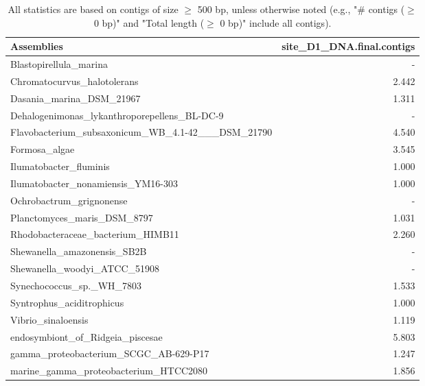\documentclass[12pt,a4paper]{article}
\begin{document}
\begin{table}[ht]
\begin{center}
\caption{All statistics are based on contigs of size $\geq$ 500 bp, unless otherwise noted (e.g., "\# contigs ($\geq$ 0 bp)" and "Total length ($\geq$ 0 bp)" include all contigs).}
\begin{tabular}{|l*{1}{|r}|}
\hline
Assemblies & site\_D1\_DNA.final.contigs \\ \hline
Blastopirellula\_marina & - \\ \hline
Chromatocurvus\_halotolerans & 2.442 \\ \hline
Dasania\_marina\_DSM\_21967 & 1.311 \\ \hline
Dehalogenimonas\_lykanthroporepellens\_BL-DC-9 & - \\ \hline
Flavobacterium\_subsaxonicum\_WB\_4.1-42\_\_\_DSM\_21790 & 4.540 \\ \hline
Formosa\_algae & 3.545 \\ \hline
Ilumatobacter\_fluminis & 1.000 \\ \hline
Ilumatobacter\_nonamiensis\_YM16-303 & 1.000 \\ \hline
Ochrobactrum\_grignonense & - \\ \hline
Planctomyces\_maris\_DSM\_8797 & 1.031 \\ \hline
Rhodobacteraceae\_bacterium\_HIMB11 & 2.260 \\ \hline
Shewanella\_amazonensis\_SB2B & - \\ \hline
Shewanella\_woodyi\_ATCC\_51908 & - \\ \hline
Synechococcus\_sp.\_WH\_7803 & 1.533 \\ \hline
Syntrophus\_aciditrophicus & 1.000 \\ \hline
Vibrio\_sinaloensis & 1.119 \\ \hline
endosymbiont\_of\_Ridgeia\_piscesae & 5.803 \\ \hline
gamma\_proteobacterium\_SCGC\_AB-629-P17 & 1.247 \\ \hline
marine\_gamma\_proteobacterium\_HTCC2080 & 1.856 \\ \hline
\end{tabular}
\end{center}
\end{table}
\end{document}
